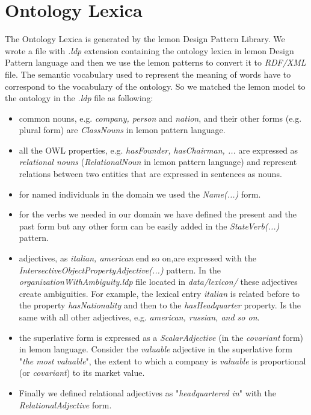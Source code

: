 \section{Ontology Lexica}
\label{sec:ontology-lexica}


The Ontology Lexica is generated by the lemon Design Pattern Library. We wrote a file with \textit{.ldp} extension containing the ontology lexica in lemon Design Pattern language and then we use the lemon patterns to convert it to \textit{RDF/XML} file. 
The semantic vocabulary used to represent the meaning of words have to correspond to the vocabulary of the ontology. So we matched the lemon model to the ontology in the \textit{.ldp} file as following:
\begin{itemize}
\item common nouns, e.g. \textit{company, person} and \textit{nation}, and their other forms (e.g. plural form) are \textit{ClassNouns} in lemon pattern language.
\item all the OWL properties, e.g. \textit{hasFounder, hasChairman, ...} are expressed as \textit{relational nouns} (\textit{RelationalNoun} in lemon pattern language) and represent relations between two entities that are expressed in sentences as nouns.
\item for named individuals in the domain we used the \textit{Name(...)} form.
\item for the verbs we needed in our domain we have defined the present and the past form but any other form can be easily added in the \textit{StateVerb(...)} pattern.
\item adjectives, as \textit{italian, american} end so on,are expressed with the \textit{IntersectiveObjectPropertyAdjective(...)} pattern. In the \textit{organizationWithAmbiguity.ldp} file located in \textit{data/lexicon/} these adjectives create ambiguities. For example, the lexical entry \textit{italian} is related before to the property \textit{hasNationality} and then to the \textit{hasHeadquarter} property. Is the same with all other adjectives, e.g. \textit{american, russian, and so on}. 
\item the superlative form is expressed as a \textit{ScalarAdjective} (in the \textit{covariant} form) in lemon language. Consider the \textit{valuable} adjective in the superlative form "\textit{the most valuable}", the extent to which a company is \textit{valuable} is proportional (or \textit{covariant}) to its market value.
\item Finally we defined relational adjectives as "\textit{headquartered in}" with the \textit{RelationalAdjective} form.
\end{itemize}
